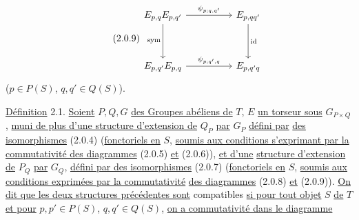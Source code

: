 \begin{equation}\tag{2.0.9}
\begin{tikzcd}[column sep=huge, row sep=huge]
E_{p,q}E_{p,q'} \arrow[r, "{\psi_{p;q,q'}}"] \arrow[d, "\mathrm{sym}"'] & E_{p,qq'} \arrow[d, "\mathrm{id}"] \\
E_{p,q'}E_{p,q} \arrow[r, "{\psi_{p;q',q}}"] & E_{p,q'q}
\end{tikzcd}
\end{equation}
($p \in P(S)$, $q,q' \in Q(S)$).



\underline{Définition} 2.1. \underline{Soient} $P,Q,G$ \underline{des Groupes abéliens de} \underline{$T$}, $E$ \underline{un torseur sous}
$G_{P\times Q}$, \underline{muni de plus d'une structure d'extension de} $Q_P$ \underline{par} $G_P$ \underline{défini par}
\underline{des isomorphismes} (2.0.4) (\underline{fonctoriels en} $S$, \underline{soumis aux conditions s'exprimant par la commutativité des diagrammes} (2.0.5) \underline{et} (2.0.6)), \underline{et d'une}
\underline{structure d'extension de} $P_Q$ \underline{par} $G_Q$, \underline{défini par des isomorphismes} (2.0.7)
(\underline{fonctoriels en} $S$, \underline{soumis aux conditions exprimées par la commutativité}
\underline{des diagrammes} (2.0.8) \underline{et} (2.0.9)). \underline{On dit que les deux structures précédentes sont} compatibles \underline{si pour tout objet} $S$ \underline{de} \underline{$T$} \underline{et pour}
$p,p' \in P(S)$, $q,q' \in Q(S)$, \underline{on a commutativité dans le diagramme}

